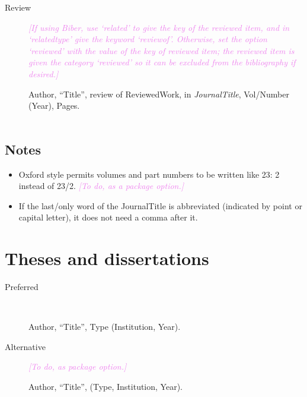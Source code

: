 \documentclass[extrafontsizes,11pt,a4paper,oneside]{memoir}
\newcommand*{\lit}[1]{\textsf{#1}}
\newcommand*{\code}[1]{`\textsf{#1}'}
\newcommand*{\aside}[1]{\textcolor{violet}{\emph{[#1]}}}
\begin{document}
\begin{description}
  \item[Review] \aside{If using Biber, use \code{related} to give the key of the reviewed item, and in \code{relatedtype} give the keyword \code{reviewof}. Otherwise, set the option \code{reviewed} with the value of the key of reviewed item; the reviewed item is given the category \code{reviewed} so it can be excluded from the bibliography if desired.}
  \par Author, \enquote{Title}, \lit{review of} ReviewedWork, \lit{in} \emph{JournalTitle}, Vol/Number (Year), Pages.
  \\
  \\
\end{description}

\subsection{Notes}

\begin{itemize}
  \item Oxford style permits volumes and part numbers to be written like 23: 2 instead of 23/2. \aside{To do, as a package option.}
  
  \item If the last\slash only word of the JournalTitle is abbreviated (indicated by point or capital letter), it does not need a comma after it.
  \\
\end{itemize}

\section{Theses and dissertations}\label{sec:thesis}

\begin{description}
  \item[Preferred]~\par Author, \enquote{Title}, Type (Institution, Year).
  \\
  
  \item[Alternative] \aside{To do, as package option.}\par Author, \enquote{Title}, (Type, Institution, Year).
\end{description}
\end{document}
